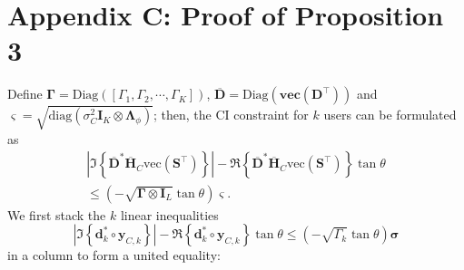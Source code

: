 \section*{Appendix C: Proof of Proposition 3}
\label{app:prop3}
Define $\mathbf{\Gamma}=\mathrm{Diag}([\Gamma_1,\Gamma_2,\cdots,\Gamma_K])$, $\overline{\mathbf{D}}=\mathrm{Diag}(\mathbf{\text{vec}(\mathbf{D}^{\top})})$ and $\bm{\varsigma}=\sqrt{\mathrm{diag}(\sigma_C^2\mathbf{I}_K\otimes\mathbf{\Lambda}_{\phi})}$; then, the CI constraint for $k$ users can be formulated as
\begin{equation}
\label{eq:mimo_ci}
\begin{aligned}
    \left| \Im\left\{\overline{\mathbf{D}}^{*}\overline{\mathbf{H}}_C\text{vec}(\mathbf{S}^{\top})\right\} \right| - \Re\left\{\overline{\mathbf{D}}^{*}\overline{\mathbf{H}}_C\text{vec}(\mathbf{S}^{\top})\right\}\tan\theta \\
    \leq (-\sqrt{\mathbf{\Gamma}\otimes\mathbf{I}_L}\tan\theta)\bm{\varsigma}.
\end{aligned}
\end{equation}
We first stack the $k$ linear inequalities
\begin{equation}
    \left| \Im\left\{\mathbf{d}_k^*\circ\mathbf{y}_{C,k}\right\} \right| - \Re\left\{\mathbf{d}_k^*\circ\mathbf{y}_{C,k}\right\}\tan\theta \leq (-\sqrt{\Gamma_k}\tan\theta)\bm{\sigma}
\end{equation}
in a column to form a united equality:
